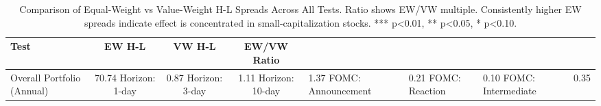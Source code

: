 \begin{table}
\caption{Comparison of Equal-Weight vs Value-Weight H-L Spreads Across All Tests. Ratio shows EW/VW multiple. Consistently higher EW spreads indicate effect is concentrated in small-capitalization stocks. *** p<0.01, ** p<0.05, * p<0.10.}
\label{tab:ew_vw_comparison}
\begin{tabular}{lccc}
\toprule
Test & EW H-L & VW H-L & EW/VW Ratio \\
\midrule
Overall Portfolio (Annual) & 70.74%
Horizon: 1-day & 0.87%
Horizon: 3-day & 1.11%
Horizon: 10-day & 1.37%
FOMC: Announcement & 0.21%
FOMC: Reaction & 0.10%
FOMC: Intermediate & 0.35%
\bottomrule
\end{tabular}
\end{table}
